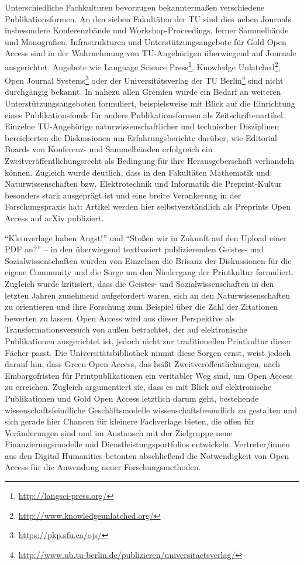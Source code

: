 \documentclass[a4paper,
fontsize=11pt,
oneside,
numbers=noperiodatend,
parskip=half-,
bibliography=totoc,
final
]{scrartcl}
\begin{document}
Unterschiedliche Fachkulturen bevorzugen bekanntermaßen verschiedene
Publikationsformen. An den sieben Fakultäten der TU sind dies neben
Journals insbesondere Konferenzbände und Workshop-Proceedings, ferner
Sammelbände und Monografien. Infrastrukturen und Unterstützungsangebote
für Gold Open Access sind in der Wahrnehmung von TU-Angehörigen
überwiegend auf Journale ausgerichtet. Angebote wie Language Science
Press\footnote{\url{http://langsci-press.org/}}, Knowledge
Unlatched\footnote{\url{http://www.knowledgeunlatched.org/}}, Open
Journal Systems\footnote{\url{https://pkp.sfu.ca/ojs/}} oder der
Universitätsverlag der TU Berlin\footnote{\url{http://www.ub.tu-berlin.de/publizieren/universitaetsverlag/}}
sind nicht durchgängig bekannt. In nahezu allen Gremien wurde ein Bedarf
an weiteren Unterstützungsangeboten formuliert, beispielsweise mit Blick
auf die Einrichtung eines Publikationsfonds für andere
Publikationsformen als Zeitschriftenartikel. Einzelne TU-Angehörige
naturwissenschaftlicher und technischer Disziplinen bereicherten die
Diskussionen um Erfahrungsberichte darüber, wie Editorial Boards von
Konferenz- und Sammelbänden erfolgreich ein Zweitveröffentlichungsrecht
als Bedingung für ihre Herausgeberschaft verhandeln können. Zugleich
wurde deutlich, dass in den Fakultäten Mathematik und
Naturwissenschaften bzw. Elektrotechnik und Informatik die
Preprint-Kultur besonders stark ausgeprägt ist und eine breite
Verankerung in der Forschungspraxis hat: Artikel werden hier
selbstverständlich als Preprints Open Access auf arXiv publiziert.

\enquote{Kleinverlage haben Angst!} und \enquote{Stoßen wir in Zukunft
auf den Upload einer PDF an?} -- in den überwiegend textbasiert
publizierenden Geistes- und Sozialwissenschaften wurden von Einzelnen
die Brisanz der Diskussionen für die eigene Community und die Sorge um
den Niedergang der Printkultur formuliert. Zugleich wurde kritisiert,
dass die Geistes- und Sozialwissenschaften in den letzten Jahren
zunehmend aufgefordert waren, sich an den Naturwissenschaften zu
orientieren und ihre Forschung zum Beispiel über die Zahl der Zitationen
bewerten zu lassen. Open Access wird aus dieser Perspektive als
Transformationsversuch von außen betrachtet, der auf elektronische
Publikationen ausgerichtet ist, jedoch nicht zur traditionellen
Printkultur dieser Fächer passt. Die Universitätsbibliothek nimmt diese
Sorgen ernst, weist jedoch darauf hin, dass Green Open Access, das heißt
Zweitveröffentlichungen, nach Embargofristen für Printpublikationen ein
veritabler Weg sind, um Open Access zu erreichen. Zugleich argumentiert
sie, dass es mit Blick auf elektronische Publikationen und Gold Open
Access letztlich darum geht, bestehende wissenschaftsfeindliche
Geschäftsmodelle wissenschaftsfreundlich zu gestalten und sich gerade
hier Chancen für kleinere Fachverlage bieten, die offen für
Veränderungen sind und im Austausch mit der Zielgruppe neue
Finanzierungsmodelle und Dienstleistungsportfolios entwickeln.
Vertreter/innen aus den Digital Humanities betonten abschließend die
Notwendigkeit von Open Access für die Anwendung neuer
Forschungsmethoden.
\end{document}

